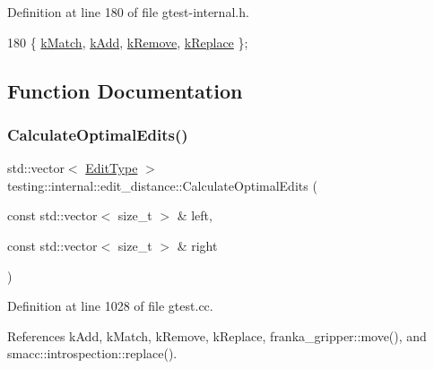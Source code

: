 Definition at line 180 of file gtest-\/internal.\+h.


\begin{DoxyCode}
180 \{ \hyperlink{namespacetesting_1_1internal_1_1edit__distance_ad46aa6da12aec1a3f166310478b53a08a7bdb9c74613a94f21b7489e0b5640a63}{kMatch}, \hyperlink{namespacetesting_1_1internal_1_1edit__distance_ad46aa6da12aec1a3f166310478b53a08a63400b073f5b311a87d568b5ae27ffe8}{kAdd}, \hyperlink{namespacetesting_1_1internal_1_1edit__distance_ad46aa6da12aec1a3f166310478b53a08a814768ef6cd0264a0a10b1e701a63e78}{kRemove}, \hyperlink{namespacetesting_1_1internal_1_1edit__distance_ad46aa6da12aec1a3f166310478b53a08afdbf30ecf9f32f60c646a34a358615f2}{kReplace} \};
\end{DoxyCode}


\subsection{Function Documentation}
\mbox{\label{namespacetesting_1_1internal_1_1edit__distance_a26323b4c2a29ea8e187aafbd4d2275db}} 
\subsubsection{\texorpdfstring{Calculate\+Optimal\+Edits()}{CalculateOptimalEdits()}\hspace{0.1cm}{\footnotesize\ttfamily [1/2]}}
{\footnotesize\ttfamily std\+::vector$<$ \hyperlink{namespacetesting_1_1internal_1_1edit__distance_ad46aa6da12aec1a3f166310478b53a08}{Edit\+Type} $>$ testing\+::internal\+::edit\+\_\+distance\+::\+Calculate\+Optimal\+Edits (\begin{DoxyParamCaption}\item[{const std\+::vector$<$ size\+\_\+t $>$ \&}]{left,  }\item[{const std\+::vector$<$ size\+\_\+t $>$ \&}]{right }\end{DoxyParamCaption})}



Definition at line 1028 of file gtest.\+cc.



References k\+Add, k\+Match, k\+Remove, k\+Replace, franka\+\_\+gripper\+::move(), and smacc\+::introspection\+::replace().



